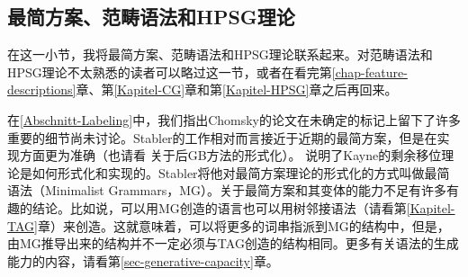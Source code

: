 \subsection{最简方案、范畴语法和HPSG理论}
\label{Abschnitt-MG}\label{sec-MG}

在这一小节，我将最简方案、范畴语法和HPSG理论联系起来。对范畴语法和HPSG理论不太熟悉的读者可以略过这一节，或者在看完第\ref{chap-feature-descriptions}章、第\ref{Kapitel-CG}章和第\ref{Kapitel-HPSG}章之后再回来。

在\ref{Abschnitt-Labeling}中，我们指出Chomsky的论文在未确定的标记上留下了许多重要的细节尚未讨论。Stabler的工作相对而言接近于近期的最简方案，但是在实现方面更为准确（也请看 关于后GB方法的形式化）。 \citet{Stabler2001a}说明了Kayne的剩余移位理论是如何形式化和实现的。Stabler将他对最简方案理论的形式化的方式叫做最简语法（Minimalist Grammars，MG）。关于最简方案和其变体\citep{Michaelis2001a-u}的能力不足有许多有趣的结论。比如说，可以用MG创造的语言也可以用树邻接语法\indextagc（请看第\ref{Kapitel-TAG}章）来创造。这就意味着，可以将更多的词串指派到MG的结构中，但是，由MG推导出来的结构并不一定必须与TAG创造的结构相同。更多有关语法的生成能力的内容，请看第\ref{sec-generative-capacity}章。

